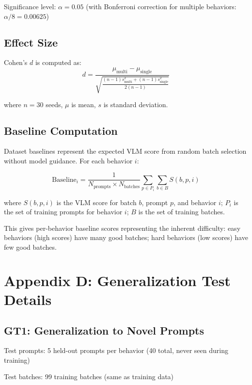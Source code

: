 \documentclass{article}
\begin{document}
Significance level: $\alpha = 0.05$ (with Bonferroni correction for multiple behaviors: $\alpha/8 = 0.00625$)

\subsection{Effect Size}

Cohen's $d$ is computed as:
\begin{equation}
d = \frac{\mu_{\text{multi}} - \mu_{\text{single}}}{\sqrt{\frac{(n-1)s_{\text{multi}}^2 + (n-1)s_{\text{single}}^2}{2(n-1)}}}
\end{equation}

where $n=30$ seeds, $\mu$ is mean, $s$ is standard deviation.

\subsection{Baseline Computation}

Dataset baselines represent the expected VLM score from random batch selection without model guidance. For each behavior $i$:

\begin{equation}
\text{Baseline}_i = \frac{1}{N_{\text{prompts}} \times N_{\text{batches}}} \sum_{p \in P_i} \sum_{b \in B} S(b, p, i)
\end{equation}

where $S(b, p, i)$ is the VLM score for batch $b$, prompt $p$, and behavior $i$; $P_i$ is the set of training prompts for behavior $i$; $B$ is the set of training batches.

This gives per-behavior baseline scores representing the inherent difficulty: easy behaviors (high scores) have many good batches; hard behaviors (low scores) have few good batches.

\section*{Appendix D: Generalization Test Details}
\label{app:generalization_details}

\subsection{GT1: Generalization to Novel Prompts}
Test prompts: 5 held-out prompts per behavior (40 total, never seen during training)

Test batches: 99 training batches (same as training data)
\end{document}
